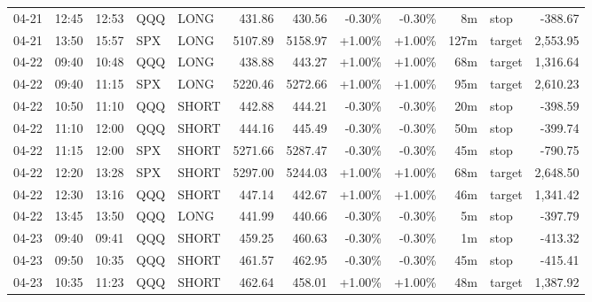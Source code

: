 \documentclass[11pt,a4paper]{article}
\begin{document}
\begin{center}
\begin{longtable}{>{\color{txtmain}}l l l l l r r r r r >{\color{txtmain}}l r}
04-21 & 12:45 & 12:53 & QQQ & LONG & 431.86 & 430.56 & \textcolor{lossred}{-0.30\%} & \textcolor{lossred}{-0.30\%} & 8m & stop & \textcolor{lossred}{-388.67} \\
04-21 & 13:50 & 15:57 & SPX & LONG & 5107.89 & 5158.97 & \textcolor{wingreen}{+1.00\%} & \textcolor{wingreen}{+1.00\%} & 127m & target & \textcolor{wingreen}{2,553.95} \\
04-22 & 09:40 & 10:48 & QQQ & LONG & 438.88 & 443.27 & \textcolor{wingreen}{+1.00\%} & \textcolor{wingreen}{+1.00\%} & 68m & target & \textcolor{wingreen}{1,316.64} \\
04-22 & 09:40 & 11:15 & SPX & LONG & 5220.46 & 5272.66 & \textcolor{wingreen}{+1.00\%} & \textcolor{wingreen}{+1.00\%} & 95m & target & \textcolor{wingreen}{2,610.23} \\
04-22 & 10:50 & 11:10 & QQQ & SHORT & 442.88 & 444.21 & \textcolor{lossred}{-0.30\%} & \textcolor{lossred}{-0.30\%} & 20m & stop & \textcolor{lossred}{-398.59} \\
04-22 & 11:10 & 12:00 & QQQ & SHORT & 444.16 & 445.49 & \textcolor{lossred}{-0.30\%} & \textcolor{lossred}{-0.30\%} & 50m & stop & \textcolor{lossred}{-399.74} \\
04-22 & 11:15 & 12:00 & SPX & SHORT & 5271.66 & 5287.47 & \textcolor{lossred}{-0.30\%} & \textcolor{lossred}{-0.30\%} & 45m & stop & \textcolor{lossred}{-790.75} \\
04-22 & 12:20 & 13:28 & SPX & SHORT & 5297.00 & 5244.03 & \textcolor{wingreen}{+1.00\%} & \textcolor{wingreen}{+1.00\%} & 68m & target & \textcolor{wingreen}{2,648.50} \\
04-22 & 12:30 & 13:16 & QQQ & SHORT & 447.14 & 442.67 & \textcolor{wingreen}{+1.00\%} & \textcolor{wingreen}{+1.00\%} & 46m & target & \textcolor{wingreen}{1,341.42} \\
04-22 & 13:45 & 13:50 & QQQ & LONG & 441.99 & 440.66 & \textcolor{lossred}{-0.30\%} & \textcolor{lossred}{-0.30\%} & 5m & stop & \textcolor{lossred}{-397.79} \\
04-23 & 09:40 & 09:41 & QQQ & SHORT & 459.25 & 460.63 & \textcolor{lossred}{-0.30\%} & \textcolor{lossred}{-0.30\%} & 1m & stop & \textcolor{lossred}{-413.32} \\
04-23 & 09:50 & 10:35 & QQQ & SHORT & 461.57 & 462.95 & \textcolor{lossred}{-0.30\%} & \textcolor{lossred}{-0.30\%} & 45m & stop & \textcolor{lossred}{-415.41} \\
04-23 & 10:35 & 11:23 & QQQ & SHORT & 462.64 & 458.01 & \textcolor{wingreen}{+1.00\%} & \textcolor{wingreen}{+1.00\%} & 48m & target & \textcolor{wingreen}{1,387.92} \\

\end{longtable}
\end{center}
\end{document}
